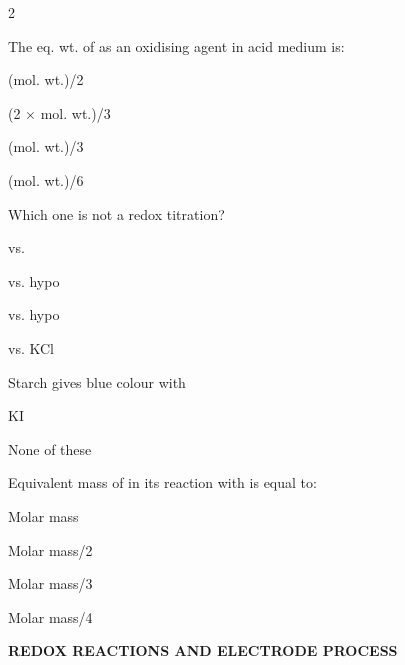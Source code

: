 \documentclass[10pt,a4paper]{article}
\begin{document}
\begin{multicols}{2}
\begin{questions}[start=119]
\item The eq. wt. of  as an oxidising agent in acid medium is:
\begin{options}
  \item (mol. wt.)/2
  \item (2 $\times$ mol. wt.)/3
  \item (mol. wt.)/3
  \item (mol. wt.)/6
\end{options}

\item Which one is not a redox titration?
\begin{options}
  \item {} vs. 
  \item {} vs. hypo
  \item {} vs. hypo
  \item {} vs. KCl
\end{options}

\item Starch gives blue colour with
\begin{options}
  \item KI
  \item {}
  \item {}
  \item None of these
\end{options}

\item Equivalent mass of  in its reaction with  is equal to:
\begin{options}
  \item Molar mass
  \item Molar mass/2
  \item Molar mass/3
  \item Molar mass/4
\end{options}

\end{questions}
\end{multicols}

\begin{mdframed}[backgroundcolor=sectionbg, linewidth=0pt, innerleftmargin=6pt, innerrightmargin=6pt, innertopmargin=4pt, innerbottommargin=4pt]
\color{white}\bfseries\small\centering REDOX REACTIONS AND ELECTRODE PROCESS
\end{mdframed}
\end{document}

